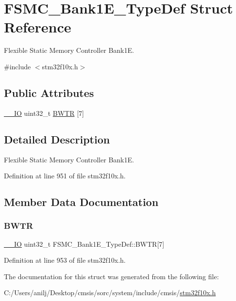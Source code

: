 \hypertarget{struct_f_s_m_c___bank1_e___type_def}{}\section{F\+S\+M\+C\+\_\+\+Bank1\+E\+\_\+\+Type\+Def Struct Reference}
\label{struct_f_s_m_c___bank1_e___type_def}


Flexible Static Memory Controller Bank1E.  




{\ttfamily \#include $<$stm32f10x.\+h$>$}

\subsection*{Public Attributes}
\begin{DoxyCompactItemize}
\item 
\hyperlink{core__sc300_8h_aec43007d9998a0a0e01faede4133d6be}{\+\_\+\+\_\+\+IO} uint32\+\_\+t \hyperlink{struct_f_s_m_c___bank1_e___type_def_afe650877ca972faff9c61fcb364c7b66}{B\+W\+TR} \mbox{[}7\mbox{]}
\end{DoxyCompactItemize}


\subsection{Detailed Description}
Flexible Static Memory Controller Bank1E. 

Definition at line 951 of file stm32f10x.\+h.



\subsection{Member Data Documentation}
\mbox{\label{struct_f_s_m_c___bank1_e___type_def_afe650877ca972faff9c61fcb364c7b66}} 
\subsubsection{\texorpdfstring{B\+W\+TR}{BWTR}}
{\footnotesize\ttfamily \hyperlink{core__sc300_8h_aec43007d9998a0a0e01faede4133d6be}{\+\_\+\+\_\+\+IO} uint32\+\_\+t F\+S\+M\+C\+\_\+\+Bank1\+E\+\_\+\+Type\+Def\+::\+B\+W\+TR\mbox{[}7\mbox{]}}



Definition at line 953 of file stm32f10x.\+h.



The documentation for this struct was generated from the following file\+:\begin{DoxyCompactItemize}
\item 
C\+:/\+Users/anilj/\+Desktop/cmsis/sorc/system/include/cmsis/\hyperlink{stm32f10x_8h}{stm32f10x.\+h}\end{DoxyCompactItemize}
